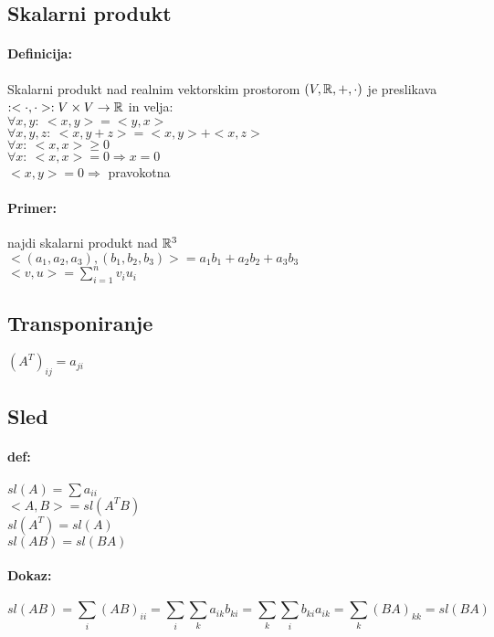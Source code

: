 \subsection{Skalarni produkt}
\paragraph{Definicija:} Skalarni produkt nad realnim vektorskim prostorom $(V, \mathbb{R}, +, \cdot)$ je preslikava $:<\cdot , \cdot >: V\times V \rightarrow \mathbb{R}$ in velja:\\
\indent $\forall x, y:\ <x, y> = <y, x>$\\
\indent $\forall x,y,z:\ <x, y+z> = <x,y> + <x, z>$\\
\indent $\forall x:\ <x, x> \geq 0$\\
\indent $\forall x:\ <x, x> = 0 \Rightarrow x=0$\\
\indent $<x, y> = 0 \Rightarrow$ pravokotna

\paragraph{Primer:} najdi skalarni produkt nad $\mathbb{R}^3$\\
\indent $<(a_1, a_2, a_3), (b_1, b_2, b_3)> = a_1b_1 + a_2b_2 + a_3b_3$\\
\indent $<v, u> = \sum_{i=1}^{n}v_iu_i$


\subsection{Transponiranje}
$(A^T)_{ij} = a_{ji}$

\subsection{Sled} 
\paragraph{def:} $sl(A) = \sum a_{ii}$\\
\indent $<A, B> = sl(A^TB)$\\
\indent $sl(A^T) = sl(A)$\\
\indent $sl(AB) = sl(BA)$

\paragraph{Dokaz:}
\[ sl(AB) = \sum_{i}(AB)_{ii} = \sum_i \sum_k a_{ik}b_{ki} = \sum_k \sum_i b_{ki}a_{ik} = \sum_k (BA)_{kk} = sl(BA)\]

